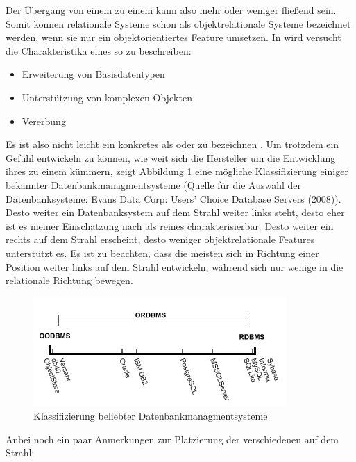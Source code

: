 Der Übergang von einem \RDBMS zu einem \ORDBMS kann also mehr oder weniger fließend sein. Somit können relationale Systeme schon als objektrelationale Systeme bezeichnet werden, wenn sie nur ein objektorientiertes Feature umsetzen. In \cite{ordbms-the-road-ahead} wird versucht die Charakteristika eines \ORDBMS so zu beschreiben: 
\begin{itemize}
\item Erweiterung von Basisdatentypen
\item Unterstützung von komplexen Objekten
\item Vererbung
\end{itemize}
Es ist also nicht leicht ein konkretes \DBMS als \ORDBMS oder \RDBMS zu bezeichnen \cite{ordbms-the-next-wave}. Um trotzdem ein Gefühl entwickeln zu können, wie weit sich die Hersteller um die Entwicklung ihres \RDBMS zu einem \ORDBMS kümmern, zeigt Abbildung \ref{object-relational-dbms} eine mögliche Klassifizierung einiger bekannter Datenbankmanagmentsysteme (Quelle für die Auswahl der Datenbanksysteme: Evans Data Corp: Users’ Choice Database Servers (2008)). Desto weiter ein Datenbanksystem auf dem Strahl weiter links steht, desto eher ist es meiner Einschätzung nach als reines \OODBMS charakterisierbar. Desto weiter ein \DBMS rechts auf dem Strahl erscheint, desto weniger objektrelationale Features unterstützt es. Es ist zu beachten, dass die meisten \RDBMS sich in Richtung einer Position weiter links auf dem Strahl entwickeln, während sich nur wenige \OODBMS in die relationale Richtung bewegen.
\begin{figure}[htbp]
  \includegraphics[width=\textwidth]{figures/ordbms}
  \caption{Klassifizierung beliebter Datenbankmanagmentsysteme}
  \label{object-relational-dbms}
\end{figure}
Anbei noch ein paar Anmerkungen zur Platzierung der verschiedenen \DBMS auf dem Strahl:
